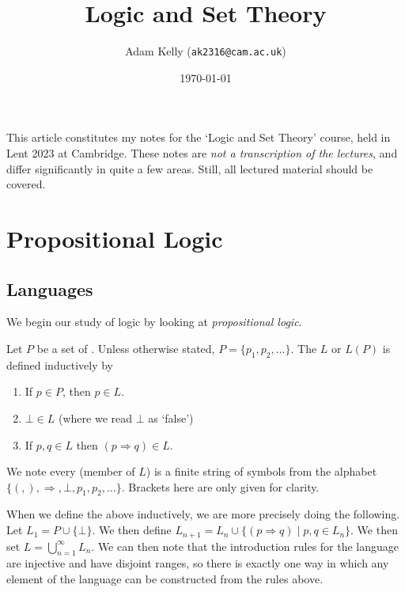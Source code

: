 \documentclass[a4paper]{scrartcl}
\title{Logic and Set Theory}
\author{Adam Kelly (\texttt{ak2316@cam.ac.uk})}
\date{\today}
\begin{document}
\maketitle


This article constitutes my notes for the `Logic and Set Theory' course, held in Lent 2023 at Cambridge. These notes are \emph{not a transcription of the lectures}, and differ significantly in quite a few areas. Still, all lectured material should be covered.



\tableofcontents

\section{Propositional Logic}

\subsection{Languages}

We begin our study of logic by looking at \emph{propositional logic}.

\begin{definition}[Language]
  Let $P$ be a set of . Unless otherwise stated, $P = \{p_1, p_2, \dots\}$. The  $L$ or $L(P)$ is defined inductively by
  \begin{enumerate}
    \item If $p \in P$, then $p \in L$.
    \item $\bot \in L$ (where we read $\bot$ as `false')
    \item If $p, q \in L$ then $(p \Rightarrow q) \in L$.
  \end{enumerate}
\end{definition}

We note every  (member of $L$) is a finite string of symbols from the alphabet $\{(,),\Rightarrow, \bot, p_1, p_2, \dots\}$. Brackets here are only given for clarity.

When we define the above inductively, we are more precisely doing the following. Let $L_1 = P \cup \{\bot\}$. We then define $L_{n + 1} = L_n \cup \{(p \Rightarrow q) \mid p, q \in L_n\}$. We then set $L = \bigcup_{n = 1}^{\infty} L_n$. We can then note that the introduction rules for the language are injective and have disjoint ranges, so there is exactly one way in which any element of the language can be constructed from the rules above.
\end{document}
